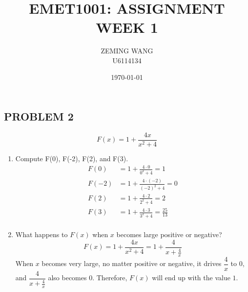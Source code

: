 \documentclass{article}
\begin{document}
\title{EMET1001: ASSIGNMENT WEEK 1}
\author{ZEMING WANG\\U6114134}
\date{\today}
\maketitle

\subsection*{PROBLEM 2}
\vspace{1em}
\begin{equation*}
    F(x) = 1 + \frac{4x}{x^2+4}
\end{equation*}
\vspace{1em}

\begin{enumerate}[label=(\alph*)]
\item Compute F(0), F(-2), F(2), and F(3). 
\begin{equation*}
\begin{aligned}
    F(0) &= 1 + \frac{4 \cdot 0}{0^2 + 4} = 1 \\
    F(-2) &= 1 + \frac{4 \cdot (-2)}{(-2)^2 + 4} = 0 \\
    F(2) &= 1 + \frac{4 \cdot 2}{2^2 + 4} = 2 \\
    F(3) &= 1 + \frac{4 \cdot 3}{3^2 + 4} = \frac{25}{13} \\
\end{aligned}
\end{equation*}

\item What happens to $F(x)$ when $x$ becomes large positive or negative? 
\begin{equation*}
    F(x) = 1 + \frac{4x}{x^2+4} = 1 + \frac{4}{x + \frac{4}{x}}
\end{equation*}
When $x$ becomes very large, no matter positive or negative, 
it drives $\dfrac{4}{x}$ to $0$, and $\dfrac{4}{x + \frac{4}{x}}$ also becomes $0$.
Therefore, $F(x)$ will end up with the value $1$.


\end{enumerate}
\end{document}
